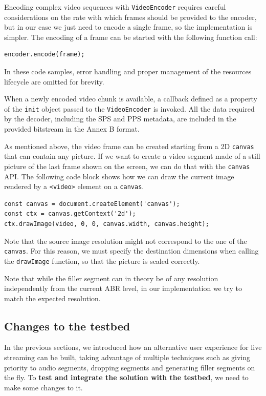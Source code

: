 Encoding complex video sequences with \texttt{VideoEncoder} requires careful considerations on the rate with which frames should be provided to the encoder, but in our case we just need to encode a single frame, so the implementation is simpler. The encoding of a frame can be started with the following function call:

\begin{verbatim}
encoder.encode(frame);
\end{verbatim}

In these code samples, error handling and proper management of the resources lifecycle are omitted for brevity.

When a newly encoded video chunk is available, a callback defined as a property of the \texttt{init} object passed to the \texttt{VideoEncoder} is invoked. All the data required by the decoder, including the SPS and PPS metadata, are included in the provided bitstream in the Annex B format.

As mentioned above, the video frame can be created starting from a 2D \texttt{canvas} that can contain any picture. If we want to create a video segment made of a still picture of the last frame shown on the screen, we can do that with the \texttt{canvas} API. The following code block shows how we can draw the current image rendered by a \texttt{<video>} element on a \texttt{canvas}.

\begin{verbatim}
const canvas = document.createElement('canvas');
const ctx = canvas.getContext('2d');
ctx.drawImage(video, 0, 0, canvas.width, canvas.height);
\end{verbatim}

Note that the source image resolution might not correspond to the one of the \texttt{canvas}. For this reason, we must specify the destination dimensions when calling the \texttt{drawImage} function, so that the picture is scaled correctly.

Note that while the filler segment can in theory be of any resolution independently from the current ABR level, in our implementation we try to match the expected resolution.

\subsection{Changes to the testbed}
\label{sec:improvements/impl/newtestbed}

In the previous sections, we introduced how an alternative user experience for live streaming can be built, taking advantage of multiple techniques such as giving priority to audio segments, dropping segments and generating filler segments on the fly. To \textbf{test and integrate the solution with the testbed}, we need to make some changes to it.

